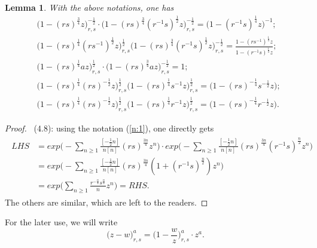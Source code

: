 \documentclass{amsproc}
\newtheorem{lemm}[theo]{Lemma}
\theoremstyle{remark}
\numberwithin{equation}{section}
\begin{document}
\begin{lemm} {\label{l:1} With the above notations, one has
\begin{eqnarray}
&\big(1-(rs)^{\frac{3}{4}}z\big)_{r,s}^{-\frac{1}{2}}\cdot \big(1-(rs)^{\frac{3}{4}}(r^{-1}s)^{\frac{1}{2}}z\big)_{r,s}^{-\frac{1}{2}}
=\big(1-(r^{-1}s)^{\frac{1}{4}}z\big)^{-1};\\
&\big(1-(rs)^{\frac{1}{4}}(rs^{-1})^{\frac{1}{2}}z\big)_{r,s}^{\frac{1}{2}}\big(1-(rs)^{\frac{3}{4}}(r^{-1}s)^{\frac{1}{2}}z\big)_{r,s}^{-\frac{1}{2}}
=\frac{1-(rs^{-1})^\frac{1}{4}z}{1-(r^{-1}s)^\frac{1}{4}z};\\
&\big(1-(rs)^{\frac{1}{4}}a z\big)_{r,s}^{\frac{1}{2}}\cdot \big(1-(rs)^{\frac{3}{4}}a z\big)_{r,s}^{-\frac{1}{2}}
=1;\\
&\big(1-(rs)^{\frac{1}{4}}(rs)^{-\frac{1}{2}}z\big)_{r,s}^{\frac{1}{2}}\big(1-(rs)^{\frac{1}{4}}s^{-1}z\big)_{r,s}^{\frac{1}{2}}
=\big(1-(rs)^{-\frac{1}{4}}s^{-\frac{1}{2}}z\big);\\
&\big(1-(rs)^{\frac{1}{4}}(rs)^{-\frac{1}{2}}z\big)_{r,s}^{\frac{1}{2}}\big(1-(rs)^{\frac{1}{4}}r^{-1}z\big)_{r,s}^{\frac{1}{2}}
=\big(1-(rs)^{-\frac{1}{4}}r^{-\frac{1}{2}}z\big).
\end{eqnarray}
}\end{lemm}
\begin{proof}\, (4.8): using the notation (\ref{n:1}), one directly gets
\begin{eqnarray*}
\begin{split}
LHS&=exp\big(-\sum_{{n\geq 1}}\frac{[-\frac{1}{2}n]}{n[n]}(rs)^{\frac{3n}{4}}z^{n}\big)\cdot
exp\big(-\sum_{{n\geq 1}}\frac{[-\frac{1}{2}n]}{n[n]}(rs)^{\frac{3n}{4}}(r^{-1}s)^{\frac{n}{2}}z^{n}\big)\\
&=exp\big(-\sum_{{n\geq 1}}\frac{[-\frac{1}{2}n]}{n[n]}(rs)^{\frac{3n}{4}}(1+(r^{-1}s)^{\frac{n}{2}})z^{n}\big)\\
&=exp\big(\sum_{{n\geq 1}}\frac{r^{-\frac{n}{4}}s^{\frac{n}{4}}}{n}z^{n}\big)=RHS.
\end{split}
\end{eqnarray*}
The others are similar, which are left to the readers.
\end{proof}
For the later use, we will write
$$\big(z-w\big)_{r,s}^{a}=
\big(1-\frac{w}{z}\big)_{r,s}^{a}\cdot z^a.$$
\end{document}

